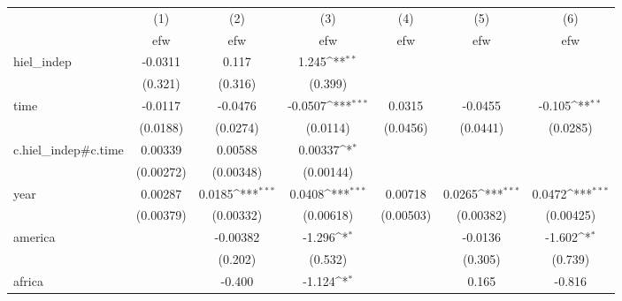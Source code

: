 {
\def\sym#1{\ifmmode^{#1}\else\(^{#1}\)\fi}
\begin{tabular}{l*{6}{c}}
\hline\hline
            &\multicolumn{1}{c}{(1)}&\multicolumn{1}{c}{(2)}&\multicolumn{1}{c}{(3)}&\multicolumn{1}{c}{(4)}&\multicolumn{1}{c}{(5)}&\multicolumn{1}{c}{(6)}\\
            &\multicolumn{1}{c}{efw}&\multicolumn{1}{c}{efw}&\multicolumn{1}{c}{efw}&\multicolumn{1}{c}{efw}&\multicolumn{1}{c}{efw}&\multicolumn{1}{c}{efw}\\
\hline
hiel\_indep  &     -0.0311         &       0.117         &       1.245\sym{**} &                     &                     &                     \\
            &     (0.321)         &     (0.316)         &     (0.399)         &                     &                     &                     \\
[1em]
time        &     -0.0117         &     -0.0476         &     -0.0507\sym{***}&      0.0315         &     -0.0455         &      -0.105\sym{**} \\
            &    (0.0188)         &    (0.0274)         &    (0.0114)         &    (0.0456)         &    (0.0441)         &    (0.0285)         \\
[1em]
c.hiel\_indep#c.time&     0.00339         &     0.00588         &     0.00337\sym{*}  &                     &                     &                     \\
            &   (0.00272)         &   (0.00348)         &   (0.00144)         &                     &                     &                     \\
[1em]
year        &     0.00287         &      0.0185\sym{***}&      0.0408\sym{***}&     0.00718         &      0.0265\sym{***}&      0.0472\sym{***}\\
            &   (0.00379)         &   (0.00332)         &   (0.00618)         &   (0.00503)         &   (0.00382)         &   (0.00425)         \\
[1em]
america     &                     &    -0.00382         &      -1.296\sym{*}  &                     &     -0.0136         &      -1.602\sym{*}  \\
            &                     &     (0.202)         &     (0.532)         &                     &     (0.305)         &     (0.739)         \\
[1em]
africa      &                     &      -0.400         &      -1.124\sym{*}  &                     &       0.165         &      -0.816         \\

\end{tabular}}
